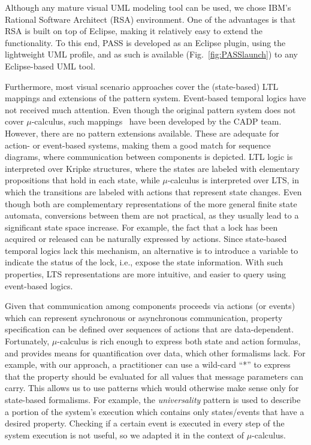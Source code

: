 \documentclass[letter]{llncs}
\begin{document}
Although any mature visual UML modeling tool 
can be used, we chose IBM's Rational Software Architect (RSA) environment.
One of the advantages is that RSA is built on top of Eclipse, making 
it relatively easy to extend the functionality. To this end, PASS is developed as an Eclipse plugin, using the 
lightweight UML profile, and as such is available (Fig.~\ref{fig:PASSlaunch}) to any Eclipse-based UML tool.

Furthermore, most visual scenario approaches cover the (state-based) LTL mappings and extensions of the pattern system. 
Event-based temporal logics have not received much attention. Even though the original pattern 
system does not cover $\mu$-calculus, such mappings~\cite{RAFMC} have been developed by the CADP team.
However, there are no pattern extensions available. These are adequate for action- or event-based systems,
making them a good match for sequence diagrams, where communication between components is depicted.
LTL logic is interpreted over Kripke structures, where the states are labeled with elementary 
propositions that hold in each state, while $\mu$-calculus is interpreted over LTS, in which the transitions
are labeled with actions that represent state changes.
Even though both are complementary representations of the more general finite state automata, 
conversions between them are not practical, as they usually lead to a significant state space increase. 
For example, the fact that a lock has
been acquired or released can be naturally expressed by actions. Since state-based
temporal logics lack this mechanism, an alternative is to introduce a variable to indicate
the status of the lock, i.e., expose the state information. With such properties, LTS
representations are more intuitive, and easier to query using event-based logics.
\vspace{-2 pt}

Given that communication among components proceeds via actions (or events) which can
represent synchronous or asynchronous communication, property specification
can be defined over sequences of actions that are data-dependent.
Fortunately, $\mu$-calculus is rich enough to express both state and action formulas,
and provides means for quantification over data, which other formalisms lack. 
For example, with our approach, a practitioner can use 
a wild-card ``*'' to express that the property should be evaluated for all values
that message parameters can carry. This allows us to use patterns which would otherwise
make sense only for state-based formalisms. For example, the \emph{universality}
pattern is used to describe a portion of the system's execution which contains only states/events that have a desired property.
Checking if a certain event is executed in every step of the system execution is not useful,
so we adapted it in the context of $\mu$-calculus. 
\vspace{-1 pt}
\end{document}
